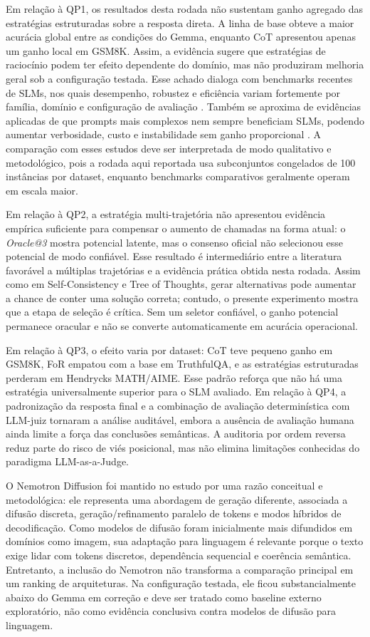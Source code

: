 \documentclass[12pt]{article}
\makeatletter
\newcommand{\oracle}{\mbox{\textit{Oracle@3}}}
\makeatother
\begin{document}
Em relação à QP1, os resultados desta rodada não sustentam ganho agregado das estratégias estruturadas sobre a resposta direta. A linha de base obteve a maior acurácia global entre as condições do Gemma, enquanto CoT apresentou apenas um ganho local em GSM8K. Assim, a evidência sugere que estratégias de raciocínio podem ter efeito dependente do domínio, mas não produziram melhoria geral sob a configuração testada. Esse achado dialoga com benchmarks recentes de SLMs, nos quais desempenho, robustez e eficiência variam fortemente por família, domínio e configuração de avaliação \cite{thinkslm2025,slmbench2025}. Também se aproxima de evidências aplicadas de que prompts mais complexos nem sempre beneficiam SLMs, podendo aumentar verbosidade, custo e instabilidade sem ganho proporcional \cite{xu2025news}. A comparação com esses estudos deve ser interpretada de modo qualitativo e metodológico, pois a rodada aqui reportada usa subconjuntos congelados de 100 instâncias por dataset, enquanto benchmarks comparativos geralmente operam em escala maior.

Em relação à QP2, a estratégia multi-trajetória não apresentou evidência empírica suficiente para compensar o aumento de chamadas na forma atual: o \oracle{} mostra potencial latente, mas o consenso oficial não selecionou esse potencial de modo confiável. Esse resultado é intermediário entre a literatura favorável a múltiplas trajetórias e a evidência prática obtida nesta rodada. Assim como em Self-Consistency e Tree of Thoughts, gerar alternativas pode aumentar a chance de conter uma solução correta; contudo, o presente experimento mostra que a etapa de seleção é crítica. Sem um seletor confiável, o ganho potencial permanece oracular e não se converte automaticamente em acurácia operacional.

Em relação à QP3, o efeito varia por dataset: CoT teve pequeno ganho em GSM8K, FoR empatou com a base em TruthfulQA, e as estratégias estruturadas perderam em Hendrycks MATH/AIME. Esse padrão reforça que não há uma estratégia universalmente superior para o SLM avaliado. Em relação à QP4, a padronização da resposta final e a combinação de avaliação determinística com LLM-juiz tornaram a análise auditável, embora a ausência de avaliação humana ainda limite a força das conclusões semânticas. A auditoria por ordem reversa reduz parte do risco de viés posicional, mas não elimina limitações conhecidas do paradigma LLM-as-a-Judge.

O Nemotron Diffusion foi mantido no estudo por uma razão conceitual e metodológica: ele representa uma abordagem de geração diferente, associada a difusão discreta, geração/refinamento paralelo de tokens e modos híbridos de decodificação. Como modelos de difusão foram inicialmente mais difundidos em domínios como imagem, sua adaptação para linguagem é relevante porque o texto exige lidar com tokens discretos, dependência sequencial e coerência semântica. Entretanto, a inclusão do Nemotron não transforma a comparação principal em um ranking de arquiteturas. Na configuração testada, ele ficou substancialmente abaixo do Gemma em correção e deve ser tratado como baseline externo exploratório, não como evidência conclusiva contra modelos de difusão para linguagem.
\end{document}
